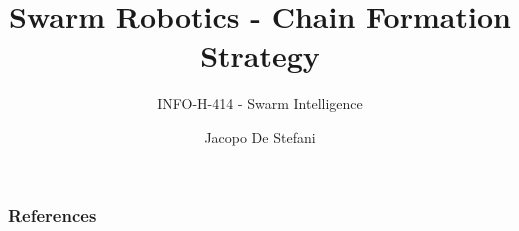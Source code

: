 \documentclass{beamer}
\author{Jacopo De Stefani}
\title{Swarm Robotics - Chain Formation Strategy}
\subtitle{INFO-H-414 - Swarm Intelligence}
\institute{Universite' Libre de Bruxelles}
\begin{document}
\begin{frame}[t,plain]
\titlepage
\end{frame}



\begin{frame}[allowframebreaks]
         \frametitle{References}
         
         
\end{frame}
\end{document}
